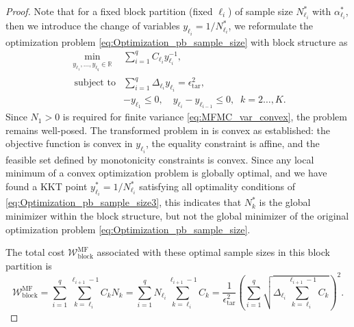 \begin{proof}
Note that for a fixed block partition (fixed $\ell_i$) of sample size $N_{\ell_i}^*$ with $\alpha_{\ell_i}^*$, then 
we introduce the change of variables $y_{\ell_i} = 1/N_{\ell_i}^*$, we reformulate the optimization problem \eqref{eq:Optimization_pb_sample_size} with block structure  as
%
\begin{equation}\label{eq:Optimization_pb_sample_size3}
    \begin{array}{ll}
    \min \limits_{\begin{array}{c}\scriptstyle y_{\ell_1},\ldots, y_{\ell_q}\in \mathbb{R}
\end{array}} &\displaystyle \sum_{i=1}^q C_{\ell_i}y_{\ell_i}^{-1},\\
       \;\,\text{subject to} &\displaystyle \sum_{i=1}^q \Delta_{\ell_i} y_{\ell_i}= \epsilon_{\text{tar}}^2,\\[2pt]
       &\displaystyle -y_{\ell_1}\le 0,\quad \displaystyle y_{\ell_i}-y_{\ell_{i-1}}\le 0, \;\; k=2\ldots,K.
    \end{array}
\end{equation}
%
Since $N_1 > 0$ is required for finite variance \eqref{eq:MFMC_var_convex}, the problem remains well-posed. The transformed problem in is convex as established: the objective function is convex in $y_{\ell_i}$, the equality constraint is affine, and the feasible set defined by monotonicity constraints is convex. Since any local minimum of a convex optimization problem is globally optimal, and we have found a KKT point $y_{\ell_i}^* = 1/N_{\ell_i}^*$ satisfying all optimality conditions of \eqref{eq:Optimization_pb_sample_size3}, this indicates that $N_k^*$ is the global minimizer within the block structure, but not the global minimizer of the original optimization problem \eqref{eq:Optimization_pb_sample_size}.


The total cost $\mathcal{W}_{\text{block}}^{\text{MF}}$ associated with these optimal sample sizes in this block partition is
%
\begin{equation*}
\mathcal{W}_{\text{block}}^{\text{MF}} = \sum_{i=1}^q \sum_{k=\ell_i}^{\ell_{i+1}-1} C_k N_k = \sum_{i=1}^q N_{\ell_i}\sum_{k=\ell_i}^{\ell_{i+1}-1} C_k =\frac{1}{\epsilon_{\text{tar}}^2}\left(\sum_{i=1}^{q} \sqrt{\Delta_{\ell_i}\sum_{k=\ell_i}^{\ell_{i+1}-1} C_{k}}\right)^2.
\end{equation*}
%



\end{proof}
